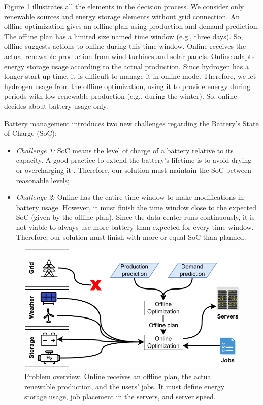 Figure \ref{fig:introduction_problem} illustrates all the elements in the decision process. We consider only renewable sources and energy storage elements without grid connection. An offline optimization gives an offline plan using production and demand prediction. The offline plan has a limited size named time window (e.g., three days). So, offline suggests actions to online during this time window. Online receives the actual renewable production from wind turbines and solar panels. Online adapts energy storage usage according to the actual production. Since hydrogen has a longer start-up time, it is difficult to manage it in online mode. Therefore, we let hydrogen usage from the offline optimization, using it to provide energy during periods with low renewable production (e.g., during the winter). So, online decides about battery usage only. 

Battery management introduces two new challenges regarding the Battery's State of Charge (SoC):

\begin{itemize}
    \item \textit{Challenge 1:} SoC means the level of charge of a battery relative to its capacity. A good practice to extend the battery's lifetime is to avoid drying or overcharging it \cite{xu2016modeling}. Therefore, our solution must maintain the SoC between reasonable levels;
    \item \textit{Challenge 2:} Online has the entire time window to make modifications in battery usage. However, it must finish the time window close to the expected SoC (given by the offline plan). Since the data center runs continuously, it is not viable to always use more battery than expected for every time window. Therefore, our solution must finish with more or equal SoC than planned.
\end{itemize}

\begin{figure}[!htb]
    \centering
    \includegraphics[scale=1]{Images/Introduction/Problem_overview_thesis.pdf}
    \caption[Problem overview]{Problem overview. Online receives an offline plan, the actual renewable production, and the users' jobs. It must define energy storage usage, job placement in the servers, and server speed.}
    \label{fig:introduction_problem}
\end{figure}

